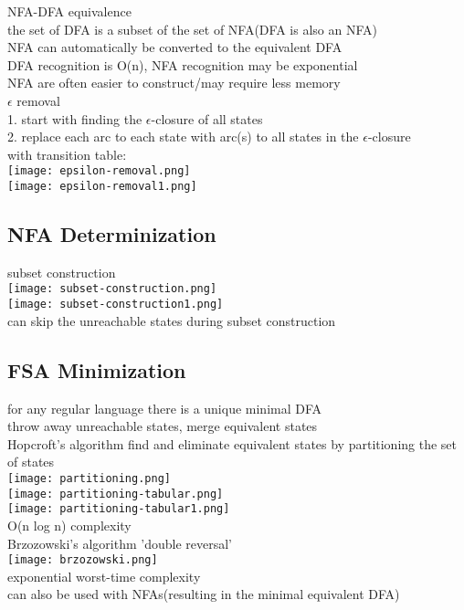 \scriptsize{NFA-DFA equivalence}\\
{\tiny the set of DFA is a subset of the set of NFA(DFA is also an NFA)\\
NFA can automatically be converted to the equivalent DFA\\
DFA recognition is O(n), NFA recognition may be exponential\\
NFA are often easier to construct/may require less memory
}\\
\scriptsize{$\epsilon$ removal}\\ 
{\tiny 1. start with finding the $\epsilon$-closure of all states\\
2. replace each arc to each state with arc(s) to all states in the $\epsilon$-closure\\
with transition table:\\
\texttt{[image: epsilon-removal.png]}\\
\texttt{[image: epsilon-removal1.png]}
}
\subsection*{NFA Determinization}
\scriptsize{subset construction}\\
{\tiny \texttt{[image: subset-construction.png]}\\
\texttt{[image: subset-construction1.png]}\\
can skip the unreachable states during subset construction
}
\subsection*{FSA Minimization}
{\tiny for any regular language there is a unique minimal DFA\\
throw away unreachable states, merge equivalent states
}\\
\scriptsize{Hopcroft's algorithm}
{\tiny find and eliminate equivalent states by partitioning the set of states\\
\texttt{[image: partitioning.png]}\\
\texttt{[image: partitioning-tabular.png]}\\
\texttt{[image: partitioning-tabular1.png]}\\
O(n log n) complexity
}\\
\scriptsize{Brzozowski’s algorithm} {\tiny 'double reversal'\\
\texttt{[image: brzozowski.png]}\\
exponential worst-time complexity\\
can also be used with NFAs(resulting in the minimal equivalent DFA)
}
